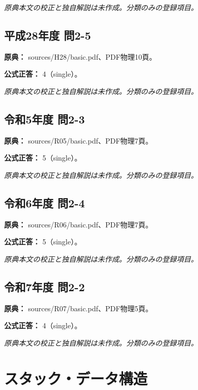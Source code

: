 \par\textit{原典本文の校正と独自解説は未作成。分類のみの登録項目。}

\subsection{平成28年度 問2-5}
\label{q:h28-reg-basic-2-5}

\noindent\textbf{原典：} sources/H28/basic.pdf、PDF物理10頁。

\textbf{公式正答：} 4（single）。

\par\textit{原典本文の校正と独自解説は未作成。分類のみの登録項目。}

\subsection{令和5年度 問2-3}
\label{q:r05-reg-basic-2-3}

\noindent\textbf{原典：} sources/R05/basic.pdf、PDF物理7頁。

\textbf{公式正答：} 5（single）。

\par\textit{原典本文の校正と独自解説は未作成。分類のみの登録項目。}

\subsection{令和6年度 問2-4}
\label{q:r06-reg-basic-2-4}

\noindent\textbf{原典：} sources/R06/basic.pdf、PDF物理7頁。

\textbf{公式正答：} 5（single）。

\par\textit{原典本文の校正と独自解説は未作成。分類のみの登録項目。}

\subsection{令和7年度 問2-2}
\label{q:r07-reg-basic-2-2}

\noindent\textbf{原典：} sources/R07/basic.pdf、PDF物理5頁。

\textbf{公式正答：} 4（single）。

\par\textit{原典本文の校正と独自解説は未作成。分類のみの登録項目。}

\section{スタック・データ構造}

